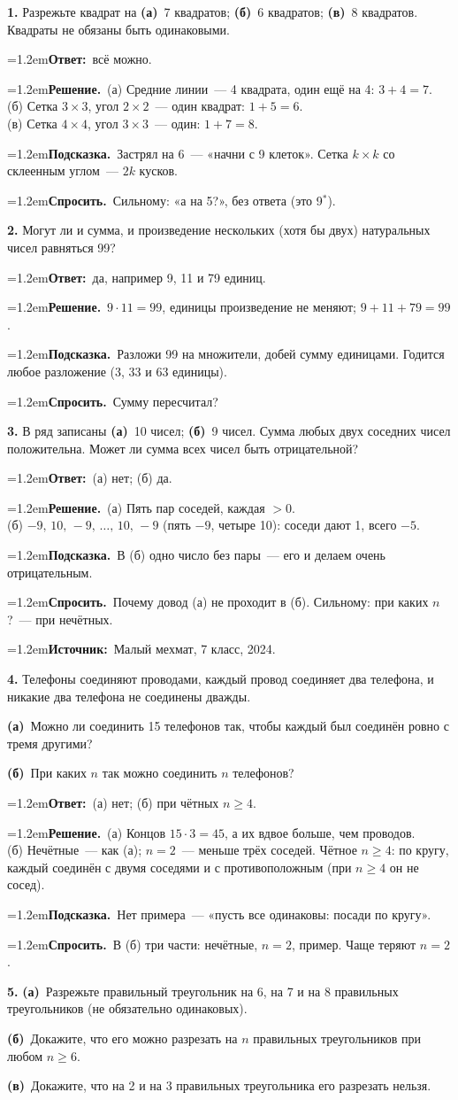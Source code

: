 \documentclass[10pt,a4paper]{article}
\newcommand{\usl}[1]{\par\vspace{7pt}\noindent\colorbox{black!7}{\parbox{\dimexpr\linewidth-2\fboxsep}{#1}}\par\vspace{2pt}}
\newcommand{\pole}[2]{\par\noindent\hangindent=1.2em\textbf{#1}\ #2\par}
\begin{document}
\usl{\textbf{1.} Разрежьте квадрат на \textbf{(а)}~7 квадратов; \textbf{(б)}~6 квадратов;
\textbf{(в)}~8 квадратов. Квадраты не обязаны быть одинаковыми.}
\pole{Ответ:}{всё можно.}
\pole{Решение.}{(а) Средние линии~--- 4 квадрата, один ещё на 4: $3+4=7$.\\ (б) Сетка $3\times3$, угол $2\times2$~--- один квадрат: $1+5=6$.\\ (в) Сетка $4\times4$, угол $3\times3$~--- один: $1+7=8$.}
\pole{Подсказка.}{Застрял на 6~--- «начни с 9 клеток». Сетка $k\times k$ со склеенным углом~--- $2k$ кусков.}
\pole{Спросить.}{Сильному: «а на 5?», без ответа (это 9$^*$).}
\usl{\textbf{2.} Могут ли и сумма, и произведение нескольких (хотя бы двух) натуральных чисел
равняться 99?}
\pole{Ответ:}{да, например 9, 11 и 79 единиц.}
\pole{Решение.}{$9\cdot11=99$, единицы произведение не меняют; $9+11+79=99$.}
\pole{Подсказка.}{Разложи 99 на множители, добей сумму единицами. Годится любое разложение (3, 33 и 63 единицы).}
\pole{Спросить.}{Сумму пересчитал?}
\usl{\textbf{3.} В ряд записаны \textbf{(а)}~10 чисел; \textbf{(б)}~9 чисел. Сумма любых двух соседних
чисел положительна. Может ли сумма всех чисел быть отрицательной?}
\pole{Ответ:}{(а) нет; (б) да.}
\pole{Решение.}{(а) Пять пар соседей, каждая $>0$.\\ (б) $-9,\,10,\,-9,\,\ldots,\,10,\,-9$ (пять $-9$, четыре 10): соседи дают 1, всего $-5$.}
\pole{Подсказка.}{В (б) одно число без пары~--- его и делаем очень отрицательным.}
\pole{Спросить.}{Почему довод (а) не проходит в (б). Сильному: при каких $n$?~--- при нечётных.}
{\small\pole{Источник:}{Малый мехмат, 7 класс, 2024.}}
\usl{\textbf{4.} Телефоны соединяют проводами, каждый провод соединяет два телефона,
и никакие два телефона не соединены дважды.\par
\textbf{(а)}~Можно ли соединить 15 телефонов так, чтобы каждый был соединён ровно с тремя другими?\par
\textbf{(б)}~При каких $n$ так можно соединить $n$ телефонов?}
\pole{Ответ:}{(а) нет; (б) при чётных $n\ge4$.}
\pole{Решение.}{(а) Концов $15\cdot3=45$, а их вдвое больше, чем проводов.\\ (б) Нечётные~--- как (а); $n=2$~--- меньше трёх соседей. Чётное $n\ge4$: по кругу, каждый соединён с двумя соседями и с противоположным (при $n\ge4$ он не сосед).}
\pole{Подсказка.}{Нет примера~--- «пусть все одинаковы: посади по кругу».}
\pole{Спросить.}{В (б) три части: нечётные, $n=2$, пример. Чаще теряют $n=2$.}
\usl{\textbf{5.} \textbf{(а)}~Разрежьте правильный треугольник на 6, на 7 и на 8 правильных треугольников
(не обязательно одинаковых).\par
\textbf{(б)}~Докажите, что его можно разрезать на $n$ правильных треугольников при любом $n\ge6$.\par
\textbf{(в)}~Докажите, что на 2 и на 3 правильных треугольника его разрезать нельзя.}
\end{document}
